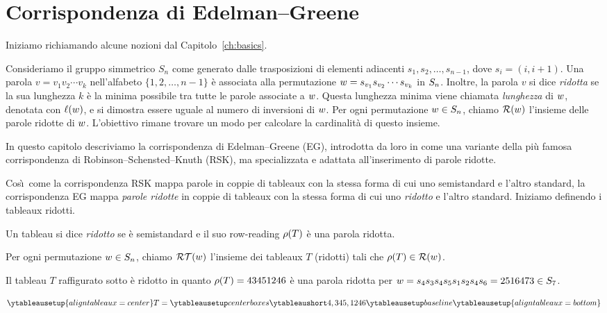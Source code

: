 
\chapter{Corrispondenza di Edelman--Greene}
\label{ch:edelman_greene}

Iniziamo richiamando alcune nozioni dal Capitolo~\ref{ch:basics}.

Consideriamo  il gruppo simmetrico $S_n$ come generato dalle trasposizioni di
elementi adiacenti $s_1, s_2, \dots, s_{n-1}$, dove $s_i = (i , i+1)$.
Una parola $v = v_1 v_2 \cdots v_k$ nell'alfabeto $\{1, 2, \dots, n-1 \}$
\`e associata alla permutazione $w = s_{v_1} s_{v_2} \cdots s_{v_k}$ in $S_n$.
Inoltre, la parola $v$ si dice \emph{ridotta} se la sua lunghezza $k$ \`e la minima
possibile tra tutte le parole associate a $w$.
Questa lunghezza minima viene chiamata \emph{lunghezza} di $w$, denotata con $\operatorname{\ell}(w)$,
e si dimostra essere uguale al numero di inversioni di $w$.
Per ogni permutazione $w \in S_n$, chiamo $\operatorname{\mathcal{R}}(w)$ l'insieme delle 
parole ridotte di $w$.
L'obiettivo rimane trovare un modo per calcolare la cardinalit\`a di questo insieme.

In questo capitolo descriviamo la corrispondenza di Edelman--Greene (EG), 
introdotta da loro in \cite[Section~6]{edelman-greene-87} come una variante
della pi\`u famosa corrispondenza di Robinson--Schensted--Knuth (RSK),
ma specializzata e adattata all'inserimento di parole ridotte.

Cos\`\i\ come la corrispondenza RSK mappa parole in coppie di tableaux con la 
stessa forma di cui uno semistandard e l'altro standard, la corrispondenza EG
mappa \emph{parole ridotte} in coppie di tableaux con la stessa forma di
cui uno \emph{ridotto} e l'altro standard.
Iniziamo definendo i tableaux ridotti.

\begin{definition}
    Un tableau si dice \emph{ridotto} se \`e semistandard e il suo
    row-reading $\operatorname{\rho}(T)$ \`e una
    parola ridotta.

    Per ogni permutazione $w \in S_n$, chiamo $\operatorname{\mathcal{RT}}(w)$ l'insieme dei 
    tableaux $T$ (ridotti) tali che $\operatorname{\rho}(T) \in \operatorname{\mathcal{R}}(w)$.
\end{definition}


\begin{example}
    Il tableau $T$ raffigurato sotto \`e ridotto in quanto $\operatorname{\rho}(T) = 43451246$
    \`e una parola ridotta per 
    $w = s_4 s_3 s_4 s_5 s_1 s_2 s_4 s_6= 2516473 \in S_7$.

    \[
        \ytableausetup{aligntableaux=center}
        T = 
        \ytableaunumber{4, 3 4 5, 1 2 4 6 }
        \ytableausetup{aligntableaux=bottom}
    \]
\end{example}

